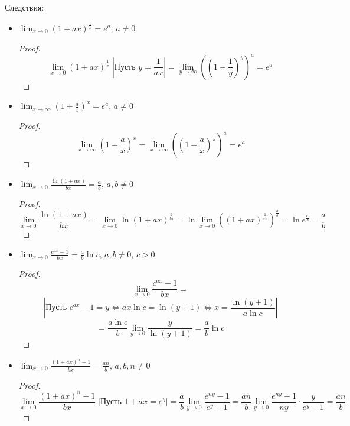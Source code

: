 Следствия:
\begin{itemize}
	\item $\displaystyle \lim_{x \to 0} (1 + ax)^{\tfrac1x} = e^a$, $a \neq 0$
	\begin{proof}
	\begin{equation*}
	\lim_{x \to 0} (1 + ax)^{\tfrac1x} \;
	\left| \text{Пусть } y = \frac1{ax} \right| =
	\lim_{y \to \infty} \left( \left( 1 + \frac1y \right)^y \right)^a =
	e^a
	\end{equation*}
	\end{proof}
	
	\item $\displaystyle \lim_{x \to \infty} \left( 1 + \frac{a}x \right)^x = e^a$, $a \neq 0$
	\begin{proof}
	\begin{equation*}
	\lim_{x \to \infty} \left( 1 + \frac{a}x \right)^x =
	\lim_{x \to \infty} \left( \left( 1 + \frac{a}x \right)^{\tfrac{x}a} \right)^a =
	e^a
	\end{equation*}
	\end{proof}
	
	\item $\displaystyle \lim_{x \to 0} \frac{\ln (1 + ax)}{bx} = \frac{a}b$, $a, b \neq 0$
	\begin{proof}
	\begin{equation*}
	\lim_{x \to 0} \frac{\ln (1 + ax)}{bx} =
	\lim_{x \to 0} \ln (1 + ax)^{\tfrac1{bx}} =
	\ln \lim_{x \to 0} \left( (1 + ax)^{\tfrac1{ax}} \right)^{\tfrac{a}b} =
	\ln e^{\tfrac{a}b} =
	\frac{a}b
	\end{equation*}
	\end{proof}
	
	\item $\displaystyle \lim_{x \to 0} \frac{c^{ax} - 1}{bx} = \frac{a}b \ln c$, $a, b \neq 0$, $c > 0$
	\begin{proof}
	\begin{equation*}
	\lim_{x \to 0} \frac{c^{ax} - 1}{bx} =
	\end{equation*}
	\begin{equation*}
	\left| \text{Пусть } c^{ax} - 1 = y \Leftrightarrow ax\ln c = \ln (y + 1) \Leftrightarrow x = \frac{\ln (y + 1)}{a\ln c} \right|
	\end{equation*}
	\begin{equation*}
	= \frac{a\ln c}b \lim_{y \to 0} \frac{y}{\ln (y + 1)} =
	\frac{a}b \ln c
	\end{equation*}
	\end{proof}
	
	\item $\displaystyle \lim_{x \to 0} \frac{(1 + ax)^n - 1}{bx} = \frac{an}b$, $a, b, n \neq 0$
	\begin{proof}
	\begin{equation*}
	\lim_{x \to 0} \frac{(1 + ax)^n - 1}{bx} \;
	\left| \text{Пусть } 1 + ax = e^y \right| =
	\frac{a}b \lim_{y \to 0} \frac{e^{ny} - 1}{e^y - 1} =
	\frac{an}b \lim_{y \to 0} \frac{e^{ny} - 1}{ny} \cdot \frac{y}{e^y - 1} =
	\frac{an}b
	\end{equation*}
	\end{proof}
\end{itemize}